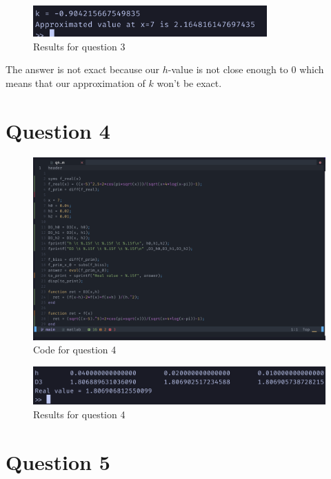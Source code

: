 \documentclass{article}
\begin{document}
\begin{figure}[H]
	\centering
	\includegraphics[width=0.8\textwidth]{imgs/q3_results.png}
	\caption{Results for question 3}
	\label{fig:q3_result}
\end{figure}

The answer is not exact because our $h$-value is not close enough to $0$ which means that our approximation of $k$ won't be exact.


\newpage
\section{Question 4}
\begin{figure}[H]
	\centering
	\includegraphics[width=\textwidth]{imgs/q4_code.png}
	\caption{Code for question 4}
	\label{fig:q4_code}
\end{figure}

\begin{figure}[H]
	\centering
	\includegraphics[width=\textwidth]{imgs/q4_results.png}
	\caption{Results for question 4}
	\label{fig:q4_result}
\end{figure}

\newpage
\section{Question 5}
\end{document}
